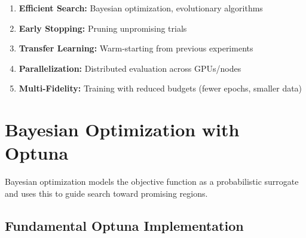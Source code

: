 \begin{enumerate}
    \item \textbf{Efficient Search:} Bayesian optimization, evolutionary algorithms
    \item \textbf{Early Stopping:} Pruning unpromising trials
    \item \textbf{Transfer Learning:} Warm-starting from previous experiments
    \item \textbf{Parallelization:} Distributed evaluation across GPUs/nodes
    \item \textbf{Multi-Fidelity:} Training with reduced budgets (fewer epochs, smaller data)
\end{enumerate}

\section{Bayesian Optimization with Optuna}

Bayesian optimization models the objective function as a probabilistic surrogate and uses this to guide search toward promising regions.

\subsection{Fundamental Optuna Implementation}


